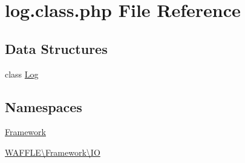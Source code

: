 \hypertarget{log_8class_8php}{}\section{log.\+class.\+php File Reference}
\label{log_8class_8php}
\subsection*{Data Structures}
\begin{DoxyCompactItemize}
\item 
class \hyperlink{class_w_a_f_f_l_e_1_1_framework_1_1_i_o_1_1_log}{Log}
\end{DoxyCompactItemize}
\subsection*{Namespaces}
\begin{DoxyCompactItemize}
\item 
 \hyperlink{namespace_framework}{Framework}
\item 
 \hyperlink{namespace_w_a_f_f_l_e_1_1_framework_1_1_i_o}{W\+A\+F\+F\+L\+E\textbackslash{}\+Framework\textbackslash{}\+IO}
\end{DoxyCompactItemize}
